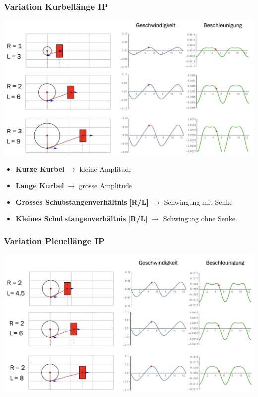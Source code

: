 \subsubsection{Variation Kurbellänge \hfill IP}
\begin{footnotesize}
    \begin{center}
        \includegraphics[width = 0.8\linewidth]{MAEIP_VariationKurbellaenge}
    \end{center}
    \begin{itemize}
        \item \textbf{Kurze Kurbel} $\to$ kleine Amplitude 
        \item \textbf{Lange Kurbel} $\to$ grosse Amplitude
        \item \textbf{Grosses Schubstangenverhältnis [R/L]} $\to$ Schwingung mit Senke
        \item \textbf{Kleines Schubstangenverhältnis [R/L]} $\to$ Schwingung ohne Senke
    \end{itemize}
\end{footnotesize}

\subsubsection{Variation Pleuellänge \hfill IP}
\begin{footnotesize}
    \begin{center}
        \includegraphics[width = 0.8\linewidth]{MAEIP_VariationPleuellaenge}
    \end{center}
\end{footnotesize}

